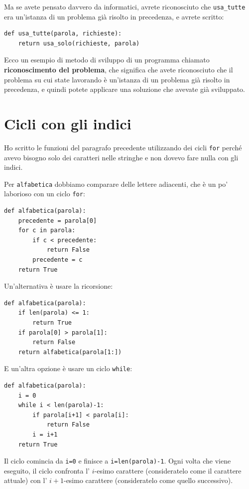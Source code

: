 \documentclass[10pt]{book}
\begin{document}
Ma se avete pensato davvero da informatici, avrete riconosciuto che \verb"usa_tutte" era un'istanza di un problema già risolto in precedenza, e avrete scritto:

\begin{verbatim}
def usa_tutte(parola, richieste):
    return usa_solo(richieste, parola)
\end{verbatim}
%
Ecco un esempio di metodo di sviluppo di un programma chiamato {\bf riconoscimento del problema}, che significa che avete riconosciuto che il problema su cui state lavorando è un'istanza di un problema già risolto in precedenza, e quindi potete applicare una soluzione che avevate già sviluppato.


\section{Cicli con gli indici}

Ho scritto le funzioni del paragrafo precedente utilizzando dei cicli {\tt for}
perché avevo bisogno solo dei caratteri nelle stringhe e non dovevo fare nulla con gli indici.


Per \verb"alfabetica" dobbiamo comparare delle lettere adiacenti, che è un po' laborioso con un ciclo {\tt for}:

\begin{verbatim}
def alfabetica(parola):
    precedente = parola[0]
    for c in parola:
        if c < precedente:
            return False
        precedente = c
    return True
\end{verbatim}


Un'alternativa è usare la ricorsione:

\begin{verbatim}
def alfabetica(parola):
    if len(parola) <= 1:
        return True
    if parola[0] > parola[1]:
        return False
    return alfabetica(parola[1:])
\end{verbatim}

E un'altra opzione è usare un ciclo {\tt while}:

\begin{verbatim}
def alfabetica(parola):
    i = 0
    while i < len(parola)-1:
        if parola[i+1] < parola[i]:
            return False
        i = i+1
    return True
\end{verbatim}
%
Il ciclo comincia da {\tt i=0} e finisce a {\tt i=len(parola)-1}.  Ogni volta che viene eseguito, il ciclo confronta l' $i$-esimo carattere (consideratelo come il carattere attuale) con l' $i+1$-esimo carattere (consideratelo come quello successivo).
\end{document}
